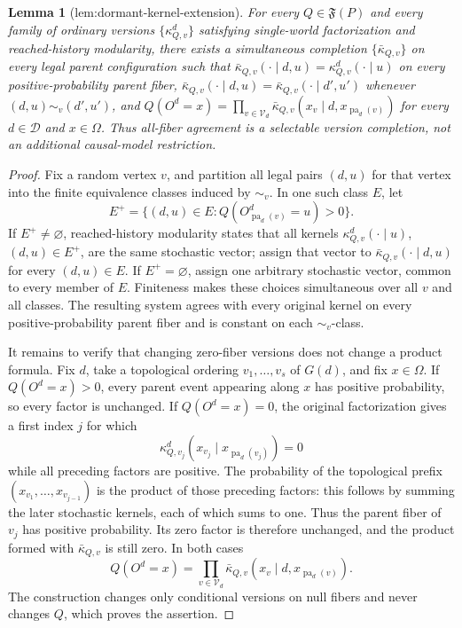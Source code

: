 \documentclass{article}
\newtheorem{lemma}{Lemma}
\begin{document}
\begin{lemma}[lem:dormant-kernel-extension]\label{lem:dormant-kernel-extension}
For every \(Q\in\mathfrak F(P)\) and every family of ordinary versions \(\{\kappa^d_{Q,v}\}\) satisfying single-world factorization and reached-history modularity, there exists a simultaneous completion \(\{\bar\kappa_{Q,v}\}\) on every legal parent configuration such that \(\bar\kappa_{Q,v}(\cdot\mid d,u)=\kappa^d_{Q,v}(\cdot\mid u)\) on every positive-probability parent fiber, \(\bar\kappa_{Q,v}(\cdot\mid d,u)=\bar\kappa_{Q,v}(\cdot\mid d',u')\) whenever \((d,u)\sim_v(d',u')\), and \(Q(O^d=x)=\prod_{v\in\mathcal V_d}\bar\kappa_{Q,v}(x_v\mid d,x_{\operatorname{pa}_d(v)})\) for every \(d\in\mathcal D\) and \(x\in\Omega\). Thus all-fiber agreement is a selectable version completion, not an additional causal-model restriction.
\end{lemma}
\begin{proof}
Fix a random vertex \(v\), and partition all legal pairs \((d,u)\) for that vertex into the finite equivalence classes induced by \(\sim_v\).  In one such class \(E\), let
\[
 E^+=\{(d,u)\in E:Q(O^d_{\operatorname{pa}_d(v)}=u)>0\}.
\]
If \(E^+\neq\varnothing\), reached-history modularity states that all kernels \(\kappa^d_{Q,v}(\cdot\mid u)\), \((d,u)\in E^+\), are the same stochastic vector; assign that vector to \(\bar\kappa_{Q,v}(\cdot\mid d,u)\) for every \((d,u)\in E\).  If \(E^+=\varnothing\), assign one arbitrary stochastic vector, common to every member of \(E\).  Finiteness makes these choices simultaneous over all \(v\) and all classes.  The resulting system agrees with every original kernel on every positive-probability parent fiber and is constant on each \(\sim_v\)-class.

It remains to verify that changing zero-fiber versions does not change a product formula.  Fix \(d\), take a topological ordering \(v_1,\ldots,v_s\) of \(G(d)\), and fix \(x\in\Omega\).  If \(Q(O^d=x)>0\), every parent event appearing along \(x\) has positive probability, so every factor is unchanged.  If \(Q(O^d=x)=0\), the original factorization gives a first index \(j\) for which
\[
 \kappa^d_{Q,v_j}(x_{v_j}\mid x_{\operatorname{pa}_d(v_j)})=0
\]
while all preceding factors are positive.  The probability of the topological prefix \((x_{v_1},\ldots,x_{v_{j-1}})\) is the product of those preceding factors: this follows by summing the later stochastic kernels, each of which sums to one.  Thus the parent fiber of \(v_j\) has positive probability.  Its zero factor is therefore unchanged, and the product formed with \(\bar\kappa_{Q,v}\) is still zero.  In both cases
\[
 Q(O^d=x)=\prod_{v\in\mathcal V_d}
 \bar\kappa_{Q,v}(x_v\mid d,x_{\operatorname{pa}_d(v)}).
\]
The construction changes only conditional versions on null fibers and never changes \(Q\), which proves the assertion.
\end{proof}
\end{document}
